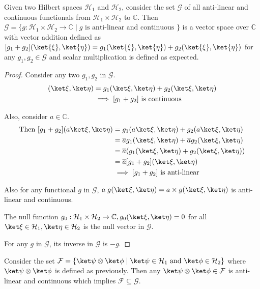 \begin{prop}
    Given two Hilbert spaces $\mathcal{H}_1$ and $\mathcal{H}_2$, consider the set $\mathcal{G}$ of all anti-linear and continuous functionals from $\mathcal{H}_1 \times \mathcal{H}_2$ to $\mathbb{C}$.
    Then $\mathcal{G} = \{ g: \mathcal{H}_1 \times \mathcal{H}_2 \to \mathbb{C} \; | \; g \text{ is anti-linear and continuous } \}$ is a vector space over $\mathbb{C}$ with vector addition defined as $[ g_1 + g_2] (\ket{\xi}, \ket{\eta}) = g_1(\ket{\xi}, \ket{\eta}) + g_2(\ket{\xi}, \ket{\eta})$ for any $g_1, g_2 \in \mathcal{G}$ and scalar multiplication is defined as expected.
\end{prop}
\begin{proof}

    Consider any two $g_1, g_2$ in $\mathcal{G}$.
    \begin{align*}
        [g_1 + g_2](\ket\xi, \ket\eta) & = g_1(\ket\xi, \ket\eta) + g_2(\ket\xi, \ket\eta)
        \\ & \implies [g_1 + g_2] \text{ is continuous}
    \end{align*}

    Also, consider $a \in \mathbb{C}$. 
    \begin{align*}
        \text{Then }[g_1 + g_2](a \ket\xi, \ket\eta) & = g_1(a \ket\xi, \ket\eta) + g_2(a \ket\xi, \ket\eta)
        \\ & = \overline{a} g_1(\ket\xi, \ket\eta) + \overline{a} g_2(\ket\xi, \ket\eta) 
        \\ & = \overline{a} (g_1(\ket\xi, \ket\eta) + g_2(\ket\xi,\ket\eta))
        \\ & = \overline{a}[g_1 + g_2](\ket\xi, \ket\eta)
        \\ & \implies [g_1 + g_2] \text{ is anti-linear}
    \end{align*}

    Also for any functional $g$ in $\mathcal{G}$, $a \; g(\ket\xi, \ket\eta) = a \times g(\ket\xi, \ket\eta)$ is anti-linear and continuous.

    The null function $g_0 : \mathcal{H}_1 \times \mathcal{H}_2 \to \mathbb{C}, g_0(\ket\xi, \ket\eta) = 0$ for all $\ket\xi \in \mathcal{H}_1, \ket\eta \in \mathcal{H}_2$ is the null vector in $\mathcal{G}$.

    For any $g$ in $\mathcal{G}$, its inverse in $\mathcal{G}$ is $-g$.
\end{proof}

\begin{note}
    Consider the set $\mathcal{F} = \{ \ket\psi \otimes \ket\phi \; | \; \ket\psi \in \mathcal{H}_1 \text{ and } \ket\phi \in \mathcal{H}_2 \}$ where $\ket\psi \otimes \ket\phi$ is defined as previously.
    Then any $\ket\psi \otimes \ket\phi \in \mathcal{F}$ is anti-linear and continuous which implies $\mathcal{F} \subseteq \mathcal{G}$.
\end{note}

